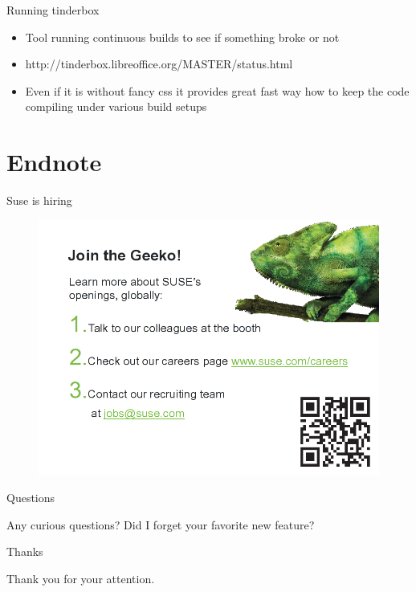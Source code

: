 \documentclass{beamer}
\begin{document}
\begin{frame}[t]{Running tinderbox}
	\begin{itemize}
	\item Tool running continuous builds to see if something broke or not
	\item http://tinderbox.libreoffice.org/MASTER/status.html
	\item Even if it is without fancy css it provides great fast way how to keep the code compiling under various build setups
	\end{itemize}
\end{frame}

\section{Endnote}

\begin{frame}{Suse is hiring}
	\begin{figure}
	\includegraphics[width= 0.8\linewidth]{suse_hiring.png}
	\end{figure}
\end{frame}

\begin{frame}{Questions}
	\begin{center}
	Any curious questions? Did I forget your favorite new feature?
	\end{center}
\end{frame}

\begin{frame}{Thanks}
	\begin{center}
	Thank you for your attention.
	\end{center}
\end{frame}
\end{document}
